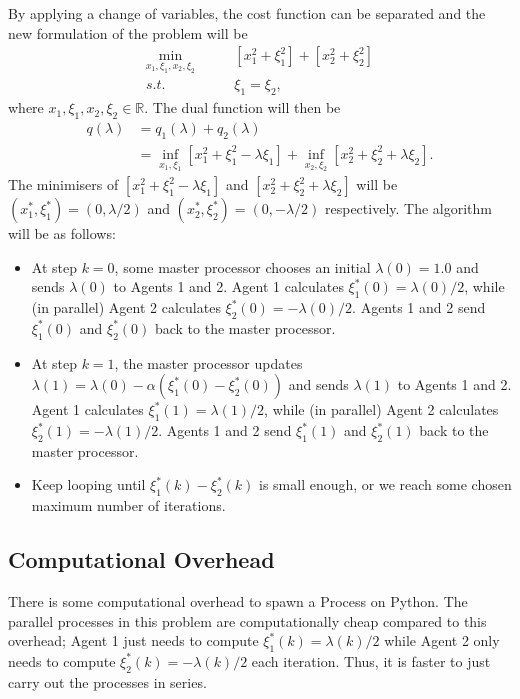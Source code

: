 \documentclass[12pt]{article}
\begin{document}
By applying a change of variables, the cost function can be separated and the new formulation of the problem will be
\begin{align*}
\min_{x_1,\xi_1,x_2,\xi_2}\qquad& [x_1^2+\xi_1^2]+[x_2^2+\xi_2^2]\\
s.t.\qquad&\xi_1=\xi_2,
\end{align*}
where $x_1,\xi_1,x_2,\xi_2\in\mathbb{R}$. The dual function will then be
\begin{align*}
q(\lambda)&=q_1(\lambda)+q_2(\lambda)\\
&=\inf_{x_1,\xi_1}[x_1^2+\xi_1^2-\lambda\xi_1]+\inf_{x_2,\xi_2}[x_2^2+\xi_2^2+\lambda\xi_2].
\end{align*}
The minimisers of $[x_1^2+\xi_1^2-\lambda\xi_1]$ and $[x_2^2+\xi_2^2+\lambda\xi_2]$ will be $(x_1^*,\xi_1^*)=(0,\lambda/2)$ and $(x_2^*,\xi_2^*)=(0,-\lambda/2)$ respectively. The algorithm will be as follows:

\begin{itemize}
	\item At step $k=0$, some master processor chooses an initial $\lambda(0)=1.0$ and sends $\lambda(0)$ to Agents 1 and 2. Agent 1 calculates $\xi_1^*(0)=\lambda(0)/2$, while (in parallel) Agent 2 calculates $\xi_2^*(0)=-\lambda(0)/2$. Agents 1 and 2 send $\xi_1^*(0)$ and $\xi_2^*(0)$ back to the master processor.
	\item At step $k=1$, the master processor updates $\lambda(1)=\lambda(0)-\alpha(\xi_1^*(0)-\xi_2^*(0))$ and sends $\lambda(1)$ to Agents 1 and 2. Agent 1 calculates $\xi_1^*(1)=\lambda(1)/2$, while (in parallel) Agent 2 calculates $\xi_2^*(1)=-\lambda(1)/2$. Agents 1 and 2 send $\xi_1^*(1)$ and $\xi_2^*(1)$ back to the master processor.
	\item Keep looping until $\xi_1^*(k)-\xi_2^*(k)$ is small enough, or we reach some chosen maximum number of iterations.
\end{itemize}


\subsection*{Computational Overhead}

There is some computational overhead to spawn a Process on Python. The parallel processes in this problem are computationally cheap compared to this overhead; Agent 1 just needs to compute $\xi_1^*(k)=\lambda(k)/2$ while Agent 2 only needs to compute $\xi_2^*(k)=-\lambda(k)/2$ each iteration. Thus, it is faster to just carry out the processes in series.
\end{document}
